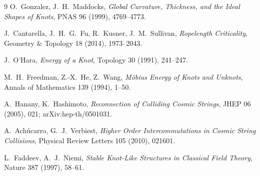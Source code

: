 \begin{thebibliography}{9}
O.~Gonzalez, J.~H.~Maddocks,
\emph{Global Curvature, Thickness, and the Ideal Shapes of Knots},
PNAS 96 (1999), 4769--4773.

J.~Cantarella, J.~H.~G.~Fu, R.~Kusner, J.~M.~Sullivan,
\emph{Ropelength Criticality},
Geometry \& Topology 18 (2014), 1973--2043.

J.~O'Hara,
\emph{Energy of a Knot},
Topology 30 (1991), 241--247.

M.~H.~Freedman, Z.-X.~He, Z.~Wang,
\emph{Möbius Energy of Knots and Unknots},
Annals of Mathematics 139 (1994), 1--50.

A.~Hanany, K.~Hashimoto,
\emph{Reconnection of Colliding Cosmic Strings},
JHEP 06 (2005), 021; arXiv:hep-th/0501031.

A.~Achúcarro, G.~J.~Verbiest,
\emph{Higher Order Intercommutations in Cosmic String Collisions},
Physical Review Letters 105 (2010), 021601.

L.~Faddeev, A.~J.~Niemi,
\emph{Stable Knot-Like Structures in Classical Field Theory},
Nature 387 (1997), 58--61.
\end{thebibliography}